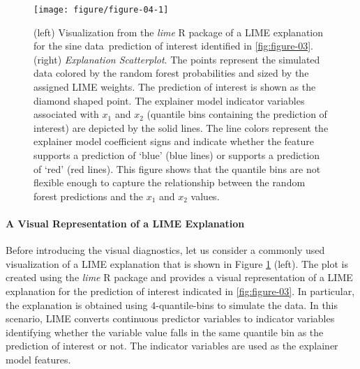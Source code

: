 \documentclass[AMS,STIX2COL]{WileyNJD-v2}\usepackage[]{graphicx}\usepackage[]{color}
\newenvironment{knitrout}{}{} %
\newcommand{\data}{sine data}
\begin{document}
\begin{figure}[!thp]
\begin{knitrout}
\color{fgcolor}

{\centering \texttt{[image: figure/figure-04-1]} 

}



\end{knitrout}
\caption{(left) Visualization from the \emph{lime} R package of a LIME explanation for the \data \ prediction of interest identified in \autoref{fig:figure-03}. (right) \emph{Explanation Scatterplot}. The points represent the simulated data colored by the random forest probabilities and sized by the assigned LIME weights. The prediction of interest is shown as the diamond shaped point. The explainer model indicator variables associated with $x_1$ and $x_2$ (quantile bins containing the prediction of interest) are depicted by the solid lines. The line colors represent the explainer model coefficient signs and indicate whether the feature supports a prediction of `blue' (blue lines) or supports a prediction of `red' (red lines). This figure shows that the quantile bins are not flexible enough to capture the relationship between the random forest predictions and the $x_1$ and $x_2$ values.}
\label{fig:figure-04}
\end{figure}

\paragraph{A Visual Representation of a LIME Explanation}

Before introducing the visual diagnostics, let us consider a commonly used visualization of a LIME explanation that is shown in Figure \ref{fig:figure-04} (left). The plot is created using the \emph{lime} R package and provides a visual representation of a LIME explanation for the prediction of interest indicated in \autoref{fig:figure-03}. In particular, the explanation is obtained using 4-quantile-bins to simulate the data. In this scenario, LIME converts continuous predictor variables to indicator variables identifying whether the variable value falls in the same quantile bin as the prediction of interest or not. The indicator variables are used as the explainer model features.  
\end{document}
